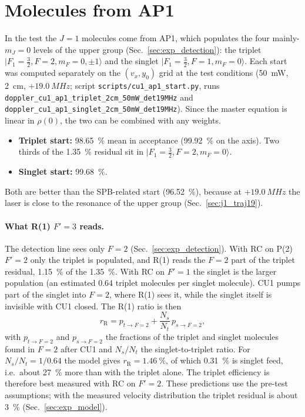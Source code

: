 \documentclass[11pt,a4paper,oneside]{report}
\newcommand{\code}[1]{\texttt{#1}}
\begin{document}
\section{Molecules from AP1}
\label{sec:j1_ap1}

In the test the $J=1$ molecules come from AP1, which populates the four mainly-$m_J=0$ levels of the
upper group (Sec.~\ref{sec:exp_detection}): the triplet $|F_1=\tfrac32,F=2,m_F=0,\pm1\rangle$ and
the singlet $|F_1=\tfrac32,F=1,m_F=0\rangle$. Each start was computed separately on the $(v_x,y_0)$
grid at the test conditions (\SI{50}{mW}, \SI{2}{cm}, $+\SI{19.0}{MHz}$; script
\code{scripts/cu1\_ap1\_start.py}, runs \code{doppler\_cu1\_ap1\_triplet\_2cm\_50mW\_det19MHz} and
\code{doppler\_cu1\_ap1\_singlet\_2cm\_50mW\_det19MHz}). Since the master equation is linear in
$\rho(0)$, the two can be combined with any weights.
\begin{itemize}
  \item \textbf{Triplet start:} \SI{98.65}{\percent} mean in acceptance (\SI{99.92}{\percent} on the
        axis). Two thirds of the \SI{1.35}{\percent} residual sit in $|F_1=\tfrac32,F=2,m_F=0\rangle$.
  \item \textbf{Singlet start:} \SI{99.68}{\percent}.
\end{itemize}
Both are better than the SPB-related start (\SI{96.52}{\percent}), because at $+\SI{19.0}{MHz}$ the
laser is close to the resonance of the upper group (Sec.~\ref{sec:j1_traj19}).

\paragraph{What R(1) $F'=3$ reads.} The detection line sees only $F=2$
(Sec.~\ref{sec:exp_detection}). With RC on P(2) $F'=2$ only the triplet is populated, and R(1)
reads the $F=2$ part of the triplet residual, \SI{1.15}{\percent} of the \SI{1.35}{\percent}. With RC
on $F'=1$ the singlet is the larger population (an estimated 0.64 triplet molecules per singlet
molecule). CU1 pumps
part of the singlet into $F=2$, where R(1) sees it, while the singlet itself is invisible with CU1
closed. The R(1) ratio is then
\begin{equation}
  r_{\mathrm R}=p_{t\to F=2}+\frac{N_s}{N_t}\,p_{s\to F=2},
  \label{eq:singlet_feed}
\end{equation}
with $p_{t\to F=2}$ and $p_{s\to F=2}$ the fractions of the triplet and singlet molecules found in
$F=2$ after CU1 and $N_s/N_t$ the singlet-to-triplet ratio. For $N_s/N_t=1/0.64$ the model gives
$r_{\mathrm R}=\SI{1.46}{\percent}$, of which \SI{0.31}{\percent} is singlet feed, i.e.\ about
\SI{27}{\percent} more than with the triplet alone. The triplet efficiency is therefore best
measured with RC on $F'=2$. These predictions use the pre-test assumptions; with the measured
velocity distribution the triplet residual is about \SI{3}{\percent} (Sec.~\ref{sec:exp_model}).
\end{document}
